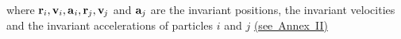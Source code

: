 \documentclass[10pt]{article}
\begin{document}
\vspace{+0.09em}

\par \bigskip \noindent where ${\mathbf{r}}_i, {\mathbf{v}}_i, {\mathbf{a}}_{\hspace{+0.045em}i}, {\mathbf{r}}_{\hspace{-0.015em}j}, {\mathbf{v}}_{\hspace{-0.06em}j}$ and ${\mathbf{a}}_{\hspace{-0.015em}j}$ are the invariant positions, the invariant velocities and the invariant accelerations of particles $i$ and $j$ \hbox {\hyperlink{a1p2}{(\hspace{+0.09em}see Annex II\hspace{+0.120em})}}
\end{document}
